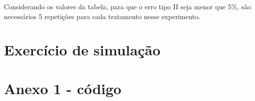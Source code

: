 \documentclass[
]{article}
\begin{document}
Considerando os valores da tabela, para que o erro tipo II seja menor
que 5\%, são necessários 5 repetições para cada tratamento nesse
experimento.

\hypertarget{exercuxedcio-de-simulauxe7uxe3o}{%
\section{Exercício de simulação}\label{exercuxedcio-de-simulauxe7uxe3o}}

\hypertarget{anexo-1---cuxf3digo}{%
\section{Anexo 1 - código}\label{anexo-1---cuxf3digo}}
\end{document}
